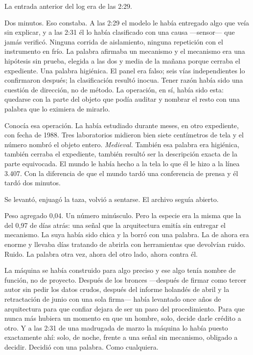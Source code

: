 La entrada anterior del log era de las 2:29.

Dos minutos. Eso constaba. A las 2:29 el modelo le había entregado algo que veía sin explicar, y a las 2:31 él lo había clasificado con una causa ---sensor--- que jamás verificó. Ninguna corrida de aislamiento, ninguna repetición con el instrumento en frío. La palabra afirmaba un mecanismo y el mecanismo era una hipótesis sin prueba, elegida a las dos y media de la mañana porque cerraba el expediente. Una palabra higiénica. El panel era falso; seis vías independientes lo confirmaron después; la clasificación resultó inocua. Tener razón había sido una cuestión de dirección, no de método. La operación, en sí, había sido esta: quedarse con la parte del objeto que podía auditar y nombrar el resto con una palabra que lo eximiera de mirarlo.

Conocía esa operación. La había estudiado durante meses, en otro expediente, con fecha de 1988. Tres laboratorios midieron bien siete centímetros de tela y el número nombró el objeto entero. \textit{Medieval.} También esa palabra era higiénica, también cerraba el expediente, también resultó ser la descripción exacta de la parte equivocada. El mundo le había hecho a la tela lo que él le hizo a la línea 3.407. Con la diferencia de que el mundo tardó una conferencia de prensa y él tardó dos minutos.

Se levantó, enjuagó la taza, volvió a sentarse. El archivo seguía abierto.

Peso agregado 0,04. Un número minúsculo. Pero la especie era la misma que la del 0,97 de días atrás: una señal que la arquitectura emitía sin entregar el mecanismo. La suya había sido chica y la borró con una palabra. La de ahora era enorme y llevaba días tratando de abrirla con herramientas que devolvían ruido. Ruido. La palabra otra vez, ahora del otro lado, ahora contra él.

La máquina se había construido para algo preciso y ese algo tenía nombre de función, no de proyecto. Después de los bronces ---después de firmar como tercer autor sin pedir los datos crudos, después del informe holandés de abril y la retractación de junio con una sola firma--- había levantado once años de arquitectura para que confiar dejara de ser un paso del procedimiento. Para que nunca más hubiera un momento en que un hombre, solo, decide darle crédito a otro. Y a las 2:31 de una madrugada de marzo la máquina lo había puesto exactamente ahí: solo, de noche, frente a una señal sin mecanismo, obligado a decidir. Decidió con una palabra. Como cualquiera.

